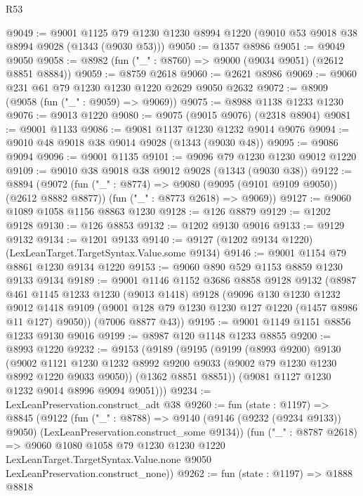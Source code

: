 \begin{lexlean}{R53}
\begin{coremodule}
@9049 := @9001
    @1125
    @79
    @1230
    @1230
    @8994
    @1220
    (@9010 @53 @9018 @38 @8994 @9028 (@1343 (@9030 @53)))
@9050 := @1357 @8986
@9051 := @9049 @9050
@9058 := @8982 (fun ("_" : @8760) => @9000 (@9034 @9051) (@2612 @8851 @8884))
@9059 := @8759 @2618
@9060 := @2621 @8986
@9069 := @9060 @231 @61 @79 @1230 @1230 @1220 @2629 @9050 @2632
@9072 := @8909 (@9058 (fun ("_" : @9059) => @9069))
@9075 := @8988 @1138 @1233 @1230
@9076 := @9013 @1220
@9080 := @9075 (@9015 @9076) (@2318 @8904)
@9081 := @9001 @1133
@9086 := @9081 @1137 @1230 @1232 @9014 @9076
@9094 := @9010 @48 @9018 @38 @9014 @9028 (@1343 (@9030 @48))
@9095 := @9086 @9094
@9096 := @9001 @1135
@9101 := @9096 @79 @1230 @1230 @9012 @1220
@9109 := @9010 @38 @9018 @38 @9012 @9028 (@1343 (@9030 @38))
@9122 := @8894
    (@9072
      (fun ("_" : @8774) => @9080 (@9095 (@9101 @9109 @9050)) (@2612 @8882 @8877))
      (fun ("_" : @8773 @2618) => @9069))
@9127 := @9060 @1089 @1058 @1156 @8863 @1230
@9128 := @126 @8879
@9129 := @1202 @9128
@9130 := @126 @8853
@9132 := @1202 @9130 @9016
@9133 := @9129 @9132
@9134 := @1201 @9133
@9140 := @9127 (@1202 @9134 @1220) (LexLeanTarget.TargetSyntax.Value.some @9134)
@9146 := @9001 @1154 @79 @8861 @1230 @9134 @1220
@9153 := @9060 @890 @529 @1153 @8859 @1230 @9133 @9134
@9189 := @9001
    @1146
    @1152
    @3686
    @8858
    @9128
    @9132
    (@8987
      @461
      @1145
      @1233
      @1230
      (@9013 @1418)
      @9128
      (@9096
        @130
        @1230
        @1232
        @9012
        @1418
        @9109
        (@9001 @128 @79 @1230 @1230 @127 @1220 (@1457 @8986 @11 @127) @9050))
      (@7006 @8877 @43))
@9195 := @9001 @1149 @1151 @8856 @1233 @9130 @9016
@9199 := @8987 @120 @1148 @1233 @8855
@9200 := @8993 @1220
@9232 := @9153
    (@9189
      (@9195
        (@9199
          (@8993 @9200)
          @9130
          (@9002
            @1121
            @1230
            @1232
            @8992
            @9200
            @9033
            (@9002 @79 @1230 @1230 @8992 @1220 @9033 @9050))
          (@1362 @8851 @8851))
        (@9081 @1127 @1230 @1232 @9014 @8996 @9094 @9051)))
@9234 := LexLeanPreservation.construct_adt @38
@9260 := fun (state : @1197) =>
  @8845
    (@9122
      (fun ("_" : @8788) =>
      @9140 (@9146 (@9232 (@9234 @9133)) @9050) (LexLeanPreservation.construct_some @9134))
      (fun ("_" : @8787 @2618) =>
      @9060
        @1080
        @1058
        @79
        @1230
        @1230
        @1220
        LexLeanTarget.TargetSyntax.Value.none
        @9050
        LexLeanPreservation.construct_none))
@9262 := fun (state : @1197) => @1888 @8818

\end{coremodule}
\end{lexlean}
